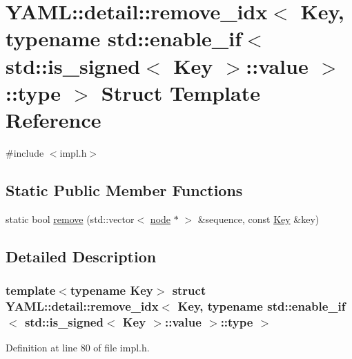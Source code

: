 \hypertarget{struct_y_a_m_l_1_1detail_1_1remove__idx_3_01_key_00_01typename_01std_1_1enable__if_3_01std_1_1is5b6d38b30a1fd839e13e20f486d53898}{}\section{Y\+A\+ML\+::detail\+::remove\+\_\+idx$<$ Key, typename std\+::enable\+\_\+if$<$ std\+::is\+\_\+signed$<$ Key $>$\+::value $>$\+::type $>$ Struct Template Reference}
\label{struct_y_a_m_l_1_1detail_1_1remove__idx_3_01_key_00_01typename_01std_1_1enable__if_3_01std_1_1is5b6d38b30a1fd839e13e20f486d53898}


{\ttfamily \#include $<$impl.\+h$>$}

\subsection*{Static Public Member Functions}
\begin{DoxyCompactItemize}
\item 
static bool \mbox{\hyperlink{struct_y_a_m_l_1_1detail_1_1remove__idx_3_01_key_00_01typename_01std_1_1enable__if_3_01std_1_1is5b6d38b30a1fd839e13e20f486d53898_a8105d0e5afbddaf72c93c5d0b7ad9ed8}{remove}} (std\+::vector$<$ \mbox{\hyperlink{class_y_a_m_l_1_1detail_1_1node}{node}} $\ast$ $>$ \&sequence, const \mbox{\hyperlink{namespace_y_a_m_l_a67c320aa50d3de7ecba1d0b8775dd684a1af533fc24b0311b8c4d5ac2870283aa}{Key}} \&key)
\end{DoxyCompactItemize}


\subsection{Detailed Description}
\subsubsection*{template$<$typename Key$>$\newline
struct Y\+A\+M\+L\+::detail\+::remove\+\_\+idx$<$ Key, typename std\+::enable\+\_\+if$<$ std\+::is\+\_\+signed$<$ Key $>$\+::value $>$\+::type $>$}



Definition at line 80 of file impl.\+h.



